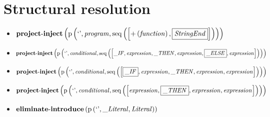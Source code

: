 \section{Structural resolution}
{\footnotesize\begin{itemize}
\item $\mathbf{project\text{-}inject}\\\left(\mathrm{p}\left(\text{`'},\mathit{program},\mathrm{seq}\left(\left[{+}\left(\mathit{function}\right), \fbox{$\mathit{StringEnd}$}\right]\right)\right)\right)$
\item $\mathbf{project\text{-}inject}\\\left(\mathrm{p}\left(\text{`'},\mathit{conditional},\mathrm{seq}\left(\left[\mathit{\_ IF}, \mathit{expression}, \mathit{\_ THEN}, \mathit{expression}, \fbox{$\mathit{\_ ELSE}$}, \mathit{expression}\right]\right)\right)\right)$
\item $\mathbf{project\text{-}inject}\\\left(\mathrm{p}\left(\text{`'},\mathit{conditional},\mathrm{seq}\left(\left[\fbox{$\mathit{\_ IF}$}, \mathit{expression}, \mathit{\_ THEN}, \mathit{expression}, \mathit{expression}\right]\right)\right)\right)$
\item $\mathbf{project\text{-}inject}\\\left(\mathrm{p}\left(\text{`'},\mathit{conditional},\mathrm{seq}\left(\left[\mathit{expression}, \fbox{$\mathit{\_ THEN}$}, \mathit{expression}, \mathit{expression}\right]\right)\right)\right)$
\item $\mathbf{eliminate\text{-}introduce}\\\left(\mathrm{p}\left(\text{`'},\mathit{\_ Literal},\mathit{Literal}\right)\right)$
\end{itemize}}
